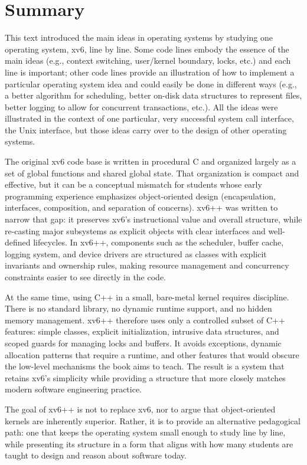\chapter{Summary}
\label{CH:SUM}

This text introduced the main ideas in operating systems by studying one
operating system, xv6, line by line.  Some code lines embody the essence of the
main ideas (e.g., context switching, user/kernel boundary, locks, etc.) and each
line is important; other code lines provide an illustration of how to implement
a particular operating system idea and could easily be done in different ways
(e.g., a better algorithm for scheduling, better on-disk data structures to
represent files, better logging to allow for concurrent transactions, etc.).
All the ideas were illustrated in the context of one particular, very successful
system call interface, the Unix interface, but those ideas carry over to the
design of other operating systems.

The original xv6 code base is written in procedural C and organized largely as a
set of global functions and shared global state.  That organization is compact
and effective, but it can be a conceptual mismatch for students whose early
programming experience emphasizes object-oriented design (encapsulation,
interfaces, composition, and separation of concerns).  xv6++ was written to
narrow that gap: it preserves xv6’s instructional value and overall structure,
while re-casting major subsystems as explicit objects with clear interfaces and
well-defined lifecycles.  In xv6++, components such as the scheduler, buffer
cache, logging system, and device drivers are structured as classes with
explicit invariants and ownership rules, making resource management and
concurrency constraints easier to see directly in the code.

At the same time, using C++ in a small, bare-metal kernel requires discipline.
There is no standard library, no dynamic runtime support, and no hidden memory
management.  xv6++ therefore uses only a controlled subset of C++ features:
simple classes, explicit initialization, intrusive data structures, and scoped
guards for managing locks and buffers.  It avoids exceptions, dynamic
allocation patterns that require a runtime, and other features that would
obscure the low-level mechanisms the book aims to teach.  The result is a
system that retains xv6’s simplicity while providing a structure that more
closely matches modern software engineering practice.

The goal of xv6++ is not to replace xv6, nor to argue that object-oriented
kernels are inherently superior.  Rather, it is to provide an alternative
pedagogical path: one that keeps the operating system small enough to study
line by line, while presenting its structure in a form that aligns with how
many students are taught to design and reason about software today.
